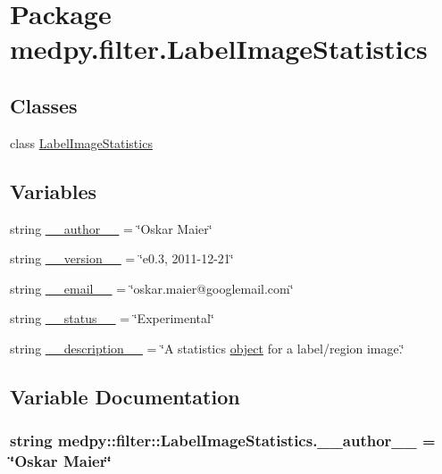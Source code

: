 \hypertarget{namespacemedpy_1_1filter_1_1LabelImageStatistics}{
\section{Package medpy.filter.LabelImageStatistics}
\label{namespacemedpy_1_1filter_1_1LabelImageStatistics}
}
\subsection*{Classes}
\begin{DoxyCompactItemize}
\item 
class \hyperlink{classmedpy_1_1filter_1_1LabelImageStatistics_1_1LabelImageStatistics}{LabelImageStatistics}
\end{DoxyCompactItemize}
\subsection*{Variables}
\begin{DoxyCompactItemize}
\item 
string \hyperlink{namespacemedpy_1_1filter_1_1LabelImageStatistics_a080e2b356eefb0583ba4b0254ea44a2b}{\_\-\_\-author\_\-\_\-} = \char`\"{}Oskar Maier\char`\"{}
\item 
string \hyperlink{namespacemedpy_1_1filter_1_1LabelImageStatistics_aa1f65b42f99701964070dd1bf68494ab}{\_\-\_\-version\_\-\_\-} = \char`\"{}e0.3, 2011-\/12-\/21\char`\"{}
\item 
string \hyperlink{namespacemedpy_1_1filter_1_1LabelImageStatistics_af41c23d7e8bf0e494884a88ac4d34c27}{\_\-\_\-email\_\-\_\-} = \char`\"{}oskar.maier@googlemail.com\char`\"{}
\item 
string \hyperlink{namespacemedpy_1_1filter_1_1LabelImageStatistics_aec4285ddcc68770264b5bb9b17ce3761}{\_\-\_\-status\_\-\_\-} = \char`\"{}Experimental\char`\"{}
\item 
string \hyperlink{namespacemedpy_1_1filter_1_1LabelImageStatistics_a9b2d6965b41017f0cba151b0a9b070ab}{\_\-\_\-description\_\-\_\-} = \char`\"{}A statistics \hyperlink{classobject}{object} for a label/region image.\char`\"{}
\end{DoxyCompactItemize}


\subsection{Variable Documentation}
\hypertarget{namespacemedpy_1_1filter_1_1LabelImageStatistics_a080e2b356eefb0583ba4b0254ea44a2b}{
\subsubsection[{\_\-\_\-author\_\-\_\-}]{\setlength{\rightskip}{0pt plus 5cm}string {\bf medpy::filter::LabelImageStatistics.\_\-\_\-author\_\-\_\-} = \char`\"{}Oskar Maier\char`\"{}}}
\label{namespacemedpy_1_1filter_1_1LabelImageStatistics_a080e2b356eefb0583ba4b0254ea44a2b}


